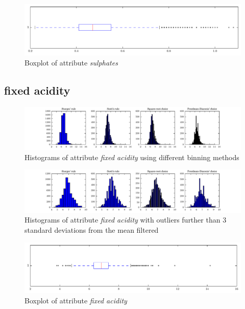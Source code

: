 \documentclass{report}
\begin{document}
\begin{figure}[H]
\includegraphics[width=\textwidth]{boxplots/sulphates.pdf}
\caption{Boxplot of attribute \emph{sulphates}}\end{figure}

\newpage\subsection{fixed acidity}
\begin{figure}[H]
\includegraphics[width=\textwidth]{histograms/fixed_acidity.pdf}
\caption{Histograms of attribute \emph{fixed acidity} using different binning methods}\end{figure}

\begin{figure}[H]
\includegraphics[width=\textwidth]{histograms/fixed_acidity_filtered.pdf}
\caption{Histograms of attribute \emph{fixed acidity} with outliers further than 3 standard deviations from the mean filtered}\n\end{figure}

\begin{figure}[H]
\includegraphics[width=\textwidth]{boxplots/fixed_acidity.pdf}
\caption{Boxplot of attribute \emph{fixed acidity}}\end{figure}
\end{document}
